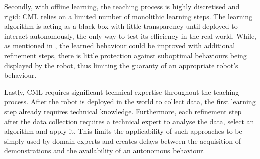 \documentclass[manuscript, review, anonymous]{acmart}
\newcommand{\ES}[1]{\added[id=ES]{#1}}
\begin{document}
Secondly, with offline learning, the teaching process is highly discretised 
and rigid: CML relies on a
limited number of monolithic learning steps. The
learning algorithm is acting as a black box with little transparency until
deployed to interact autonomously, the only way to test its efficiency in the real world.
While, as mentioned in
\cite{sequeira2016discovering},	the learned behaviour could be improved with additional refinement
steps, there is little protection against suboptimal behaviours being displayed by the
robot, thus limiting the guaranty of an appropriate robot's behaviour.

Lastly, CML requires significant technical expertise throughout the teaching
process. After the robot is deployed in the world to collect data, the first
learning step already requires technical knowledge. Furthermore, each refinement
step after the data collection requires a technical expert to analyse the data, select an algorithm and
apply it. This limits the applicability of such	approaches to be simply used by
domain experts and creates delays between the acquisition of demonstrations and
the availability of an autonomous behaviour.


\end{document}
